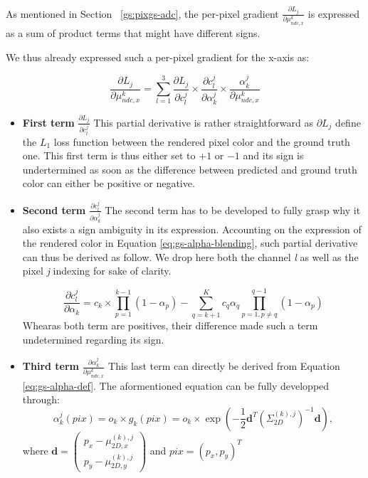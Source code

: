 As mentioned in Section ~\ref{gs:pixgs-adc}, the per-pixel gradient $\frac{\partial L_{j}}{\partial \mu^{k}_{ndc,x}}$ is expressed as a sum of product terms that might have different signs. 

We thus already expressed such a per-pixel gradient for the x-axis as: 

\begin{equation}
    \label{eq:perpix-grad}
    \frac{\partial L_{j}}{\partial \mu^{k}_{ndc,x}} = \sum \limits_{l=1}^{3} \frac{\partial L_{j}}{\partial c_{l}^{j}}\times \frac{\partial c_{l}^{j}}{\partial \alpha_{k}^{j}} \times \frac{\alpha_{k}^{j}}{\partial \mu^{k}_{ndc,x} }
    \end{equation}

\begin{itemize}
    
    \item \textbf{First term} $\frac{\partial L_{j}}{\partial c_{l}^{j}}$ 
This partial derivative is rather straightforward as $\partial L_{j}$ define the $L_{1}$ loss function between the rendered pixel color and the ground truth one. This first term is thus either set to $+1$ or $-1$ and its sign is undertermined as soon as the difference between predicted and ground truth color can either be positive or negative. 

    \item \textbf{Second term} $\frac{\partial c_{l}^{j}}{\partial \alpha_{k}^{j}}$ 
The second term has to be developed to fully grasp why it also exists a sign ambiguity in its expression. Accounting on the expression of the rendered color in Equation \eqref{eq:gs-alpha-blending}, such partial derivative can thus be derived as follow. We drop here both the channel  \textit{l} as well as the pixel \textit{j} indexing for sake of clarity.  

\begin{equation}
    \frac{\partial c_{l}^{j}}{\partial \alpha_{k}} = c_{k} \times \prod \limits_{p=1}^{k-1}(1 - \alpha_{p}) - \sum \limits_{q=k+1}^{K} c_{q}\alpha_{q}\prod \limits_{p=1,p\neq q}^{q-1}(1 - \alpha_{p})
\end{equation}
Whearas both term are positives, their difference made such a term undetermined regarding its sign. 

    \item \textbf{Third term} $\frac{\partial \alpha_{k}^{j}}{\partial \mu^{k}_{ndc,x}}$ 
This last term can directly be derived from Equation \eqref{eq:gs-alpha-def}. The aformentioned equation can be fully developped through: 
\begin{equation}
    \alpha_{k}^j(pix) =o_{k} \times g_{k}(pix) =  o_{k} \times \exp \left( -\frac{1}{2} \mathbf{d}^T \left( \Sigma_{2D}^{(k),j} \right)^{-1} \mathbf{d} \right),  
\end{equation}
where $\mathbf{d} = \begin{pmatrix}
    p_x - \mu_{2D,x}^{(k),j} \\
    p_y - \mu_{2D,y}^{(k),j}
\end{pmatrix}$ and $pix=\left( p_{x},p_{y}\right)^{T}$ 


\end{itemize}

